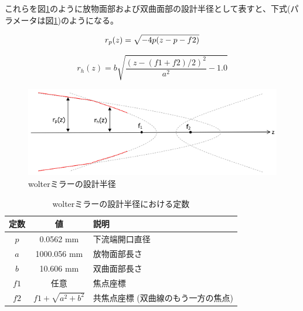 \documentclass[dvipdfmx,autodetect-engine]{jreport}
\begin{document}
これらを図\ref{fig:wolter_profile}のように放物面部および双曲面部の設計半径として表すと、下式(パラメータは図\ref{tb:wolter_profile_constants})のようになる。

\begin{equation}
    r_p(z) = \sqrt{ -4p(z - p - f2) } \\
\end{equation}

\begin{equation}
    r_h(z) = b \sqrt{ \frac{(z - (f1 + f2) / 2)^2}{a^2} - 1.0 }
\end{equation}

\begin{figure}[h!]
\centering
\includegraphics[scale=0.55]{images/mirror_experiment/mirror_profile.png}
\caption{wolterミラーの設計半径}
\label{fig:wolter_profile}
\end{figure}

\begin{table}[htb]
    \begin{center}
      \begin{tabular}{|c|c|l|} \hline
        定数 & 値 & 説明 \\ \hline
        $p$ & 0.0562 mm & 下流端開口直径 \\
        $a$ & 1000.056 mm & 放物面部長さ \\
        $b$ & 10.606 mm & 双曲面部長さ \\ 
        $f1$ & 任意 & 焦点座標 \\
        $f2$ & $f1 + \sqrt{ a^2 + b^2 }$  & 共焦点座標 (双曲線のもう一方の焦点) \\\hline
      \end{tabular}
      \label{tb:wolter_profile_constants}
      \caption{wolterミラーの設計半径における定数}
    \end{center}
\end{table}



\end{document}
